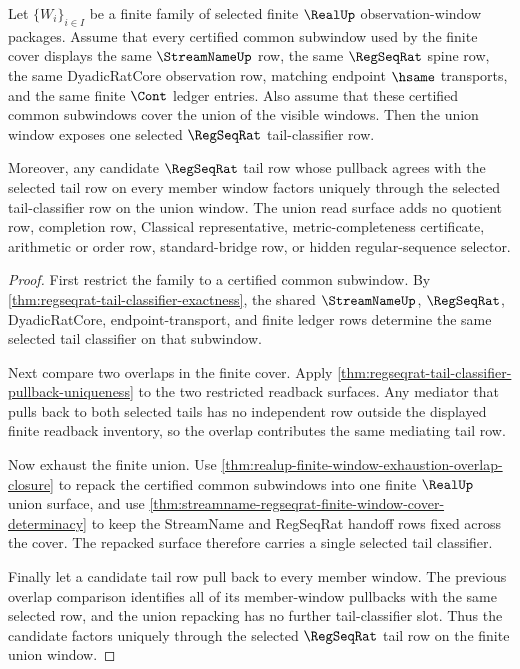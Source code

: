 \begin{theorem}
\label{thm:regseqrat-tail-classifier-union-exhaustion}
Let $\{W_i\}_{i\in I}$ be a finite family of selected finite $\RealUp$
observation-window packages. Assume that every certified common subwindow used
by the finite cover displays the same $\StreamNameUp$ row, the same
$\RegSeqRat$ spine row, the same DyadicRatCore observation row, matching
endpoint $\hsame$ transports, and the same finite $\Cont$ ledger entries. Also
assume that these certified common subwindows cover the union of the visible
windows. Then the union window exposes one selected $\RegSeqRat$
tail-classifier row.

Moreover, any candidate $\RegSeqRat$ tail row whose pullback agrees with the
selected tail row on every member window factors uniquely through the selected
tail-classifier row on the union window. The union read surface adds no
quotient row, completion row, Classical representative, metric-completeness
certificate, arithmetic or order row, standard-bridge row, or hidden
regular-sequence selector.
\end{theorem}
\begin{proof}
First restrict the family to a certified common subwindow. By
\autoref{thm:regseqrat-tail-classifier-exactness}, the shared
$\StreamNameUp$, $\RegSeqRat$, DyadicRatCore, endpoint-transport, and finite
ledger rows determine the same selected tail classifier on that subwindow.

Next compare two overlaps in the finite cover. Apply
\autoref{thm:regseqrat-tail-classifier-pullback-uniqueness} to the two
restricted readback surfaces. Any mediator that pulls back to both selected
tails has no independent row outside the displayed finite readback inventory,
so the overlap contributes the same mediating tail row.

Now exhaust the finite union. Use
\autoref{thm:realup-finite-window-exhaustion-overlap-closure} to repack the
certified common subwindows into one finite $\RealUp$ union surface, and use
\autoref{thm:streamname-regseqrat-finite-window-cover-determinacy} to keep the
StreamName and RegSeqRat handoff rows fixed across the cover. The repacked
surface therefore carries a single selected tail classifier.

Finally let a candidate tail row pull back to every member window. The previous
overlap comparison identifies all of its member-window pullbacks with the same
selected row, and the union repacking has no further tail-classifier slot. Thus
the candidate factors uniquely through the selected $\RegSeqRat$ tail row on
the finite union window.
\end{proof}

